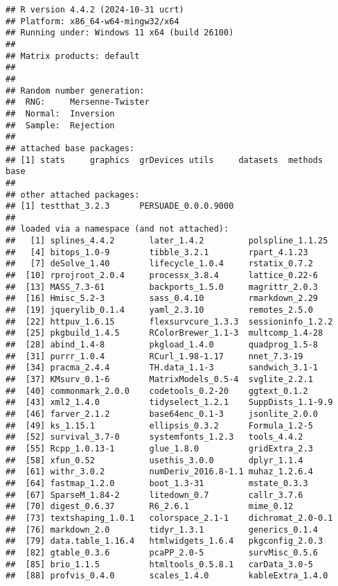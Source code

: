 \documentclass[
]{article}
\begin{document}
\begin{verbatim}
## R version 4.4.2 (2024-10-31 ucrt)
## Platform: x86_64-w64-mingw32/x64
## Running under: Windows 11 x64 (build 26100)
## 
## Matrix products: default
## 
## 
## Random number generation:
##  RNG:     Mersenne-Twister 
##  Normal:  Inversion 
##  Sample:  Rejection 
##  
## attached base packages:
## [1] stats     graphics  grDevices utils     datasets  methods   base     
## 
## other attached packages:
## [1] testthat_3.2.3      PERSUADE_0.0.0.9000
## 
## loaded via a namespace (and not attached):
##   [1] splines_4.4.2       later_1.4.2         polspline_1.1.25   
##   [4] bitops_1.0-9        tibble_3.2.1        rpart_4.1.23       
##   [7] deSolve_1.40        lifecycle_1.0.4     rstatix_0.7.2      
##  [10] rprojroot_2.0.4     processx_3.8.4      lattice_0.22-6     
##  [13] MASS_7.3-61         backports_1.5.0     magrittr_2.0.3     
##  [16] Hmisc_5.2-3         sass_0.4.10         rmarkdown_2.29     
##  [19] jquerylib_0.1.4     yaml_2.3.10         remotes_2.5.0      
##  [22] httpuv_1.6.15       flexsurvcure_1.3.3  sessioninfo_1.2.2  
##  [25] pkgbuild_1.4.5      RColorBrewer_1.1-3  multcomp_1.4-28    
##  [28] abind_1.4-8         pkgload_1.4.0       quadprog_1.5-8     
##  [31] purrr_1.0.4         RCurl_1.98-1.17     nnet_7.3-19        
##  [34] pracma_2.4.4        TH.data_1.1-3       sandwich_3.1-1     
##  [37] KMsurv_0.1-6        MatrixModels_0.5-4  svglite_2.2.1      
##  [40] commonmark_2.0.0    codetools_0.2-20    ggtext_0.1.2       
##  [43] xml2_1.4.0          tidyselect_1.2.1    SuppDists_1.1-9.9  
##  [46] farver_2.1.2        base64enc_0.1-3     jsonlite_2.0.0     
##  [49] ks_1.15.1           ellipsis_0.3.2      Formula_1.2-5      
##  [52] survival_3.7-0      systemfonts_1.2.3   tools_4.4.2        
##  [55] Rcpp_1.0.13-1       glue_1.8.0          gridExtra_2.3      
##  [58] xfun_0.52           usethis_3.0.0       dplyr_1.1.4        
##  [61] withr_3.0.2         numDeriv_2016.8-1.1 muhaz_1.2.6.4      
##  [64] fastmap_1.2.0       boot_1.3-31         mstate_0.3.3       
##  [67] SparseM_1.84-2      litedown_0.7        callr_3.7.6        
##  [70] digest_0.6.37       R6_2.6.1            mime_0.12          
##  [73] textshaping_1.0.1   colorspace_2.1-1    dichromat_2.0-0.1  
##  [76] markdown_2.0        tidyr_1.3.1         generics_0.1.4     
##  [79] data.table_1.16.4   htmlwidgets_1.6.4   pkgconfig_2.0.3    
##  [82] gtable_0.3.6        pcaPP_2.0-5         survMisc_0.5.6     
##  [85] brio_1.1.5          htmltools_0.5.8.1   carData_3.0-5      
##  [88] profvis_0.4.0       scales_1.4.0        kableExtra_1.4.0   

\end{verbatim}
\end{document}
